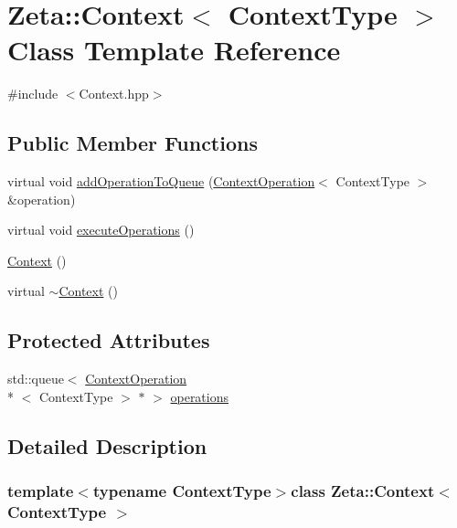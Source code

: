 \hypertarget{classZeta_1_1Context}{\section{Zeta\+:\+:Context$<$ Context\+Type $>$ Class Template Reference}
\label{classZeta_1_1Context}
}


{\ttfamily \#include $<$Context.\+hpp$>$}

\subsection*{Public Member Functions}
\begin{DoxyCompactItemize}
\item 
virtual void \hyperlink{classZeta_1_1Context_a67df6157eb24688cc02a33b6f02b458d}{add\+Operation\+To\+Queue} (\hyperlink{classZeta_1_1ContextOperation}{Context\+Operation}$<$ Context\+Type $>$ \&operation)
\item 
virtual void \hyperlink{classZeta_1_1Context_ac6162b04dc1fc87cab6bc754b9ef9f0b}{execute\+Operations} ()
\item 
\hyperlink{classZeta_1_1Context_acc478d1a08452c3ad34b7d439163dbb1}{Context} ()
\item 
virtual \hyperlink{classZeta_1_1Context_a9abaabfd04b805c0e397f6cc7198d784}{$\sim$\+Context} ()
\end{DoxyCompactItemize}
\subsection*{Protected Attributes}
\begin{DoxyCompactItemize}
\item 
std\+::queue$<$ \hyperlink{classZeta_1_1ContextOperation}{Context\+Operation}\\*
$<$ Context\+Type $>$ $\ast$ $>$ \hyperlink{classZeta_1_1Context_a6861c96e000f7ada4f5ca007defbe9a8}{operations}
\end{DoxyCompactItemize}


\subsection{Detailed Description}
\subsubsection*{template$<$typename Context\+Type$>$class Zeta\+::\+Context$<$ Context\+Type $>$}

